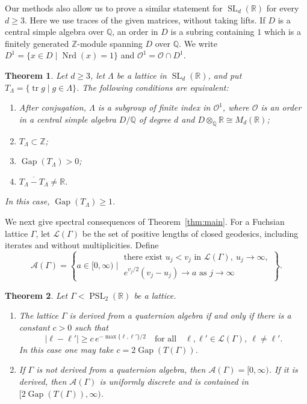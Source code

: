 \documentclass[reqno]{amsart}
\newtheorem{theorem}{Theorem}[section]
\theoremstyle{remark}
\DeclareMathOperator{\tr}{tr}
\DeclareMathOperator{\Nrd}{Nrd}
\DeclareMathOperator{\Gap}{Gap}
\DeclareMathOperator{\SL}{SL}
\DeclareMathOperator{\PSL}{PSL}
\newcommand{\R}{\mathbb R}
\newcommand{\Q}{\mathbb Q}
\newcommand{\Z}{\mathbb Z}
\newcommand{\OO}{\mathcal O}
\begin{document}
\medskip

Our methods also allow us to prove a similar statement for $\SL_d(\R)$ for every $d\ge3$. Here we use traces of the given matrices, without taking lifts. If $D$ is a central simple algebra over $\Q$, an order in $D$ is a subring containing $1$ which is a finitely generated $\Z$-module spanning $D$ over $\Q$. We write $D^1=\{x\in D \mid \Nrd(x)=1\}$ and $\OO^1=\OO\cap D^1$.

\begin{theorem}\label{thm:sld}
Let $d\ge3$, let $\Lambda$ be a lattice in $\SL_d(\R)$, and put $T_\Lambda=\{\tr g \mid g\in\Lambda\}$. The following conditions are equivalent:
\begin{enumerate}
\item After conjugation, $\Lambda$ is a subgroup of finite index in $\OO^1$, where $\OO$ is an order in a central simple algebra $D/\Q$ of degree $d$ and $D\otimes_\Q\R\cong M_d(\R)$;
\item $T_\Lambda\subset\Z$;
\item $\Gap(T_\Lambda)>0$;
\item $\overline{T_\Lambda-T_\Lambda}\ne\R$.
\end{enumerate}
In this case, $\Gap(T_\Lambda)\ge1$.
\end{theorem}


We next give spectral consequences of Theorem~\ref{thm:main}. For a Fuchsian lattice $\Gamma$, let $\mathcal L(\Gamma)$ be the set of positive lengths of closed geodesics, including iterates and without multiplicities. Define
$$
\mathcal A(\Gamma)=\left\{a\in[0,\infty) \mid
\begin{array}{l}
\text{there exist }u_j<v_j\text{ in }\mathcal L(\Gamma),\ u_j\to\infty,\\ e^{v_j/2}(v_j-u_j)\to a \text{ as } j \to \infty  \end{array}\right\}.
$$

\begin{theorem}\label{thm:lengths}
Let $\Gamma<\PSL_2(\R)$ be a lattice.
\begin{enumerate}
\item The lattice $\Gamma$ is derived from a quaternion algebra if and only if there is a constant $c>0$ such that
\begin{equation}\label{eq:lengthsep}
|\ell-\ell'|\ge c\,e^{-\max\{\ell,\ell'\}/2} \quad \text{for all} \quad \ell,\ell'\in\mathcal L(\Gamma),\ \ell\ne\ell'.
\end{equation}
In this case one may take $c=2\Gap(T(\Gamma))$.
\item If $\Gamma$ is not derived from a quaternion algebra, then $\mathcal A(\Gamma)=[0,\infty)$. If it is derived, then $\mathcal A(\Gamma)$ is uniformly discrete and is contained in $[2\Gap(T(\Gamma)),\infty)$.
\end{enumerate}
\end{theorem}
\end{document}
